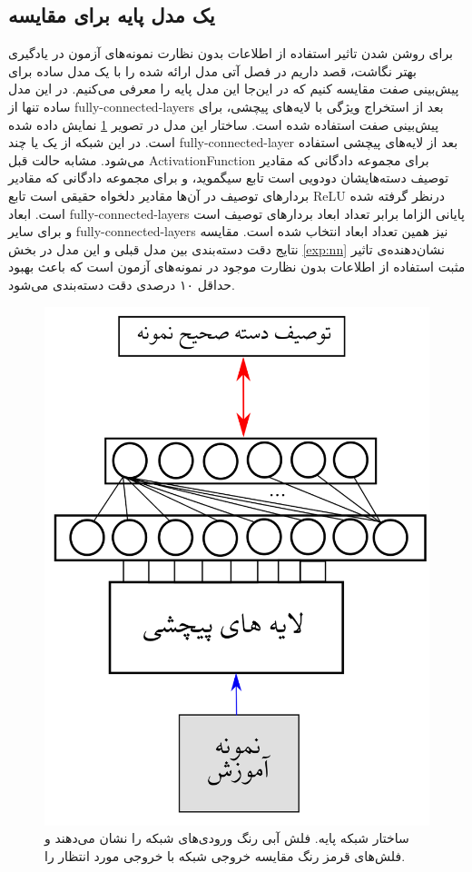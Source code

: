 \subsection{یک مدل پایه برای مقایسه}\label{nn_basic}
برای روشن شدن تاثیر استفاده از اطلاعات بدون نظارت نمونه‌های آزمون در یادگیری بهتر نگاشت، قصد داریم در فصل آتی مدل ارائه شده را با یک مدل ساده برای پیش‌بینی صفت مقایسه کنیم که در این‌جا این مدل پایه را معرفی می‌کنیم. در این مدل ساده تنها  از
\glspl{fully-connected-layer}
بعد از استخراج ویژگی با لایه‌های پیچشی، برای پیش‌بینی صفت استفاده شده است. ساختار این مدل در تصویر \ref{fig:nn_basic} نمایش داده شده است. در این شبکه از یک یا چند
\gls{fully-connected-layer}
بعد از لایه‌های پیچشی استفاده می‌شود. مشابه حالت قبل \gls{ActivationFunction} برای مجموعه دادگانی که مقادیر توصیف دسته‌هایشان دودویی است تابع سیگموید، و برای مجموعه دادگانی که مقادیر بردارهای توصیف در آن‌ها مقادیر دلخواه حقیقی است تابع \gls{ReLU} درنظر گرفته شده است.
ابعاد  \glspl{fully-connected-layer} پایانی الزاما برابر تعداد ابعاد بردارهای توصیف است و برای سایر   \glspl{fully-connected-layer} نیز همین تعداد ابعاد انتخاب شده است.
مقایسه نتایج دقت دسته‌بندی بین مدل قبلی و این مدل در بخش \ref{exp:nn} نشان‌دهنده‌ی تاثیر مثبت استفاده از اطلاعات بدون نظارت موجود در نمونه‌های آزمون است که باعث بهبود حداقل ۱۰ درصدی دقت دسته‌بندی  می‌شود.
\begin{figure}[!ht]
\centering
\includegraphics[width=0.4\linewidth]{images/basic_net}
\caption[شبکه‌ی پایه برای پیش‌بینی صفت]{
ساختار شبکه پایه. فلش آبی رنگ ورودی‌های شبکه را نشان می‌دهند و فلش‌های قرمز رنگ مقایسه خروجی شبکه با خروجی مورد انتظار را.}
\label{fig:nn_basic}
\end{figure}

